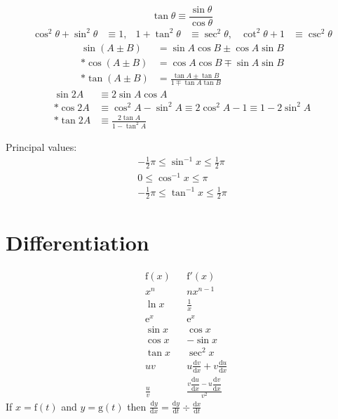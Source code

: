 \documentclass[a4paper]{article}
\begin{document}
\begin{equation}
    \tan{\theta} \equiv \frac{\sin{\theta}}{\cos{\theta}}
\end{equation}
\begin{align}
    \cos^2{\theta} + \sin^2{\theta} &\equiv 1,  &  1+\tan^2{\theta} &\equiv \sec^2{\theta},  &  \cot^2{\theta}+1 &\equiv \csc^2{\theta}
\end{align}
\begin{align}
    \sin{(A \pm B)} &= \sin A \cos B \pm \cos A \sin B \\*
    \cos{(A \pm B)} &= \cos A \cos B \mp \sin A \sin B \\*
    \tan{(A \pm B)} &= \frac{\tan A \pm \tan B}{1 \mp \tan A \tan B}
\end{align}
\begin{align}
    \sin{2A} &\equiv 2\sin A \cos A \\*
    \cos{2A} &\equiv \cos^2{A} - \sin^2{A} \equiv 2 \cos^2{A}-1 \equiv 1-2\sin^2{A} \\*
    \tan{2A} &\equiv \frac{2 \tan A}{1 - \tan^2{A}}
\end{align}

Principal values:
\begin{gather}
    -\frac{1}{2} \pi \leq \sin^{-1}{x} \leq \frac{1}{2} \pi \\
    0 \leq \cos^{-1}{x} \leq \pi \\
    -\frac{1}{2} \pi \leq \tan^{-1}{x} \leq \frac{1}{2} \pi
\end{gather}

\section{Differentiation}
\begin{align}
    &\mathrm{f}(x)  &  &\mathrm{f}'(x) \nonumber \\
    &x^n            &  &nx^{n-1} \\
    &\ln{x}         &  &\frac{1}{x} \\
    &\mathrm{e}^x   &  &\mathrm{e}^x \\
    &\sin x         &  &\cos x \\
    &\cos x         &  &-\sin x \\
    &\tan x         &  &\sec^2 x \\
    &uv             &  &{ u\frac{\mathrm{d}v}{\mathrm{d}x}+v\frac{\mathrm{d}u}{\mathrm{d}x}} \\
    &\frac{u}{v}    &  &\frac{v\dfrac{\mathrm{d}u}{\mathrm{d}x}-u\dfrac{\mathrm{d}v}{\mathrm{d}x}}{v^2}
\end{align}
If \(x = \mathrm{f}(t)\) and \(y = \mathrm{g}(t)\) then \(\frac{\mathrm{d}y}{\mathrm{d}x} = \frac{\mathrm{d}y}{\mathrm{d}t} \div \frac{\mathrm{d}x}{\mathrm{d}t}\)
\end{document}
